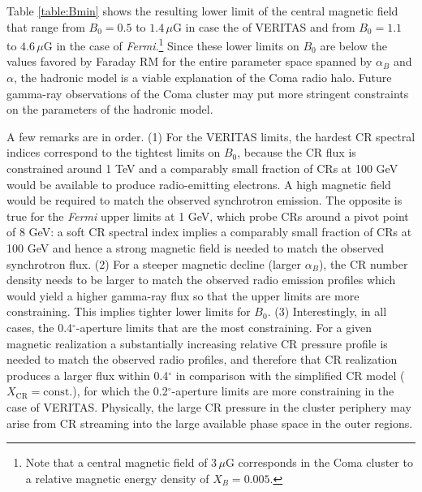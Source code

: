 \documentclass[12pt,manuscript]{aastex}
\newcommand{\rmn}{\mathrm}
\newcommand{\CR}{\mathrm{CR}}
\begin{document}
Table \ref{table:Bmin} shows the resulting lower limit of the central magnetic field that range from
$B_{0} = 0.5$ to $1.4\,\mu$G in case the of VERITAS and from $B_{0} = 1.1$ to $4.6\,\mu$G in the
case of \emph{Fermi}.\footnote{Note that a central magnetic field of $3\,\mu$G corresponds in the
  Coma cluster to a relative magnetic energy density of $X_B=0.005$.} Since these lower limits on
$B_{0}$ are below the values favored by Faraday RM for the entire parameter space spanned by
$\alpha_{B}$ and $\alpha$, the hadronic model is a viable explanation of the Coma radio halo. Future
gamma-ray observations of the Coma cluster may put more stringent constraints on the parameters of
the hadronic model.

A few remarks are in order. (1) For the VERITAS limits, the hardest
CR spectral indices correspond to the tightest limits on $B_{0}$, because the CR flux is constrained
around 1 TeV and a comparably small fraction of CRs at 100 GeV would be available to produce
radio-emitting electrons. A high magnetic field would be required to match the observed
synchrotron emission. The opposite is true for the \emph{Fermi} upper limits at 1 GeV, which
probe CRs around a pivot point of 8 GeV: a soft CR spectral index implies a comparably small
fraction of CRs at 100 GeV and hence a strong magnetic field is needed to match the observed
synchrotron flux. (2) For a steeper
magnetic decline (larger $\alpha_{B}$), the CR number density needs to be larger to match the
observed radio emission profiles which would yield a higher gamma-ray flux so that the upper limits
are more constraining. This implies tighter lower limits for $B_{0}$.  (3) Interestingly, in all
cases, the 0.4$^{\circ}$-aperture limits that are the most constraining. For a given magnetic
realization a substantially increasing relative CR pressure profile is needed to match the
observed radio profiles, and therefore that CR realization produces a larger flux within 0.4$^{\circ}$
in comparison with the simplified CR model ($X_{\CR} = \rmn{const.}$), for which the
0.2$^{\circ}$-aperture limits are more constraining in the case of VERITAS. Physically, the large
CR pressure in the cluster periphery may arise from CR streaming into the large available phase
space in the outer regions.
\end{document}
